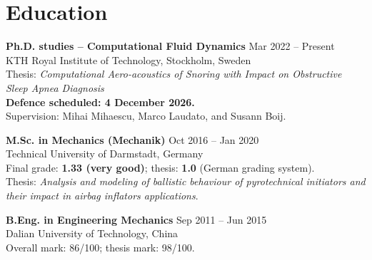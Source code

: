 \documentclass[a4paper,10pt]{article}
\begin{document}
\newpage

\section{Education}
\textbf{Ph.D. studies -- Computational Fluid Dynamics}
\hfill Mar 2022 -- Present\\
KTH Royal Institute of Technology, Stockholm, Sweden\\
Thesis: \textit{Computational Aero-acoustics of Snoring with Impact on Obstructive Sleep Apnea Diagnosis}\\
\textbf{Defence scheduled: 4 December 2026.}\\
Supervision: Mihai Mihaescu, Marco Laudato, and Susann Boij.

\vspace{5pt}
\textbf{M.Sc. in Mechanics (Mechanik)} \hfill Oct 2016 -- Jan 2020\\
Technical University of Darmstadt, Germany\\
Final grade: \textbf{1.33 (very good)}; thesis: \textbf{1.0} (German grading system).\\
Thesis: \textit{Analysis and modeling of ballistic behaviour of pyrotechnical initiators
and their impact in airbag inflators applications}.

\vspace{5pt}
\textbf{B.Eng. in Engineering Mechanics} \hfill Sep 2011 -- Jun 2015\\
Dalian University of Technology, China\\
Overall mark: 86/100; thesis mark: 98/100.
\end{document}
